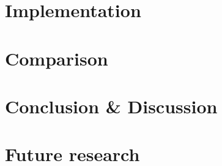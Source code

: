 \documentclass[11pt, titlepage, oneside, a4paper]{report}
\begin{document}
\newcommand{\Section}[1]{\section{#1}\vspace{-15pt}}
\newcommand{\Subsection}[1]{\vspace{-4pt}\subsection{#1}\vspace{-15pt}}
\newcommand{\Subsubsection}[1]{\vspace{-4pt}\subsubsection{#1}\vspace{-15pt}}














\chapter{Implementation}
\chapter{Comparison}
\chapter{Conclusion \& Discussion}
\chapter{Future research}

\twocolumn


\onecolumn


\end{document}
